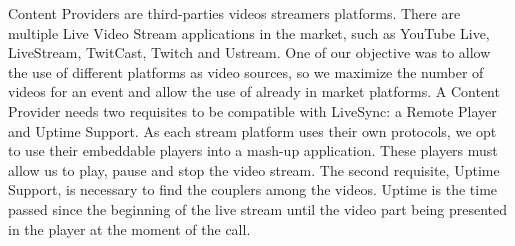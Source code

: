 Content Providers are third-parties videos streamers platforms. There are multiple Live Video Stream applications in the market, such as YouTube Live, LiveStream, TwitCast, Twitch and Ustream. One of our objective was to allow the use of different platforms as video sources, so we maximize the number of videos for an event and allow the use of already in market platforms. A Content Provider needs two requisites to be compatible with LiveSync: a Remote Player and Uptime Support. As each stream platform uses their own protocols, we opt to use their embeddable players into a mash-up application. These players must allow us to play, pause and stop the video stream. The second requisite, Uptime Support, is necessary to find the couplers among the videos. Uptime is the time passed since the beginning of the live stream until the video part being presented in the player at the moment of the call.